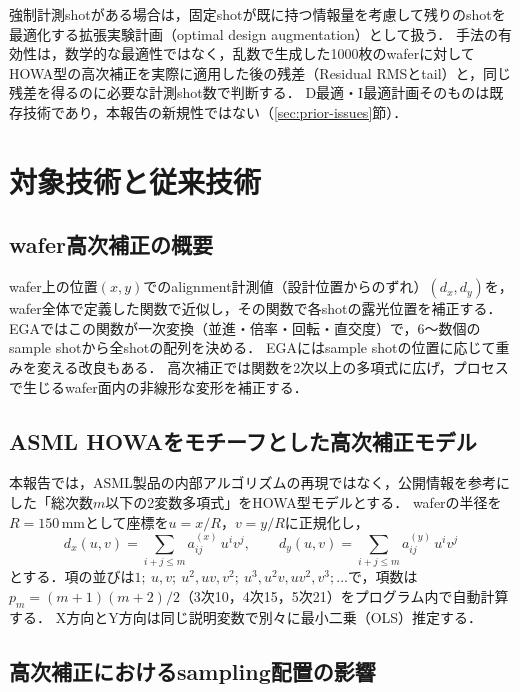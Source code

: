\documentclass[10.5pt,a4paper]{ltjsarticle}
\newcommand{\mm}{\,\mathrm{mm}}
\begin{document}
強制計測shotがある場合は，固定shotが既に持つ情報量を考慮して残りのshotを最適化する拡張実験計画（optimal design augmentation）として扱う．
手法の有効性は，数学的な最適性ではなく，乱数で生成した1000枚のwaferに対してHOWA型の高次補正を実際に適用した後の残差（Residual RMSとtail）と，同じ残差を得るのに必要な計測shot数で判断する．
D最適・I最適計画そのものは既存技術であり，本報告の新規性ではない（\ref{sec:prior-issues}節）．

\section{対象技術と従来技術}

\subsection{wafer高次補正の概要}

wafer上の位置$(x,y)$でのalignment計測値（設計位置からのずれ）$(d_x,d_y)$を，wafer全体で定義した関数で近似し，その関数で各shotの露光位置を補正する．
EGAではこの関数が一次変換（並進・倍率・回転・直交度）で，6〜数個のsample shotから全shotの配列を決める\cite{slonaker1988}．
EGAにはsample shotの位置に応じて重みを変える改良もある\cite{us5493402}．
高次補正では関数を2次以上の多項式に広げ，プロセスで生じるwafer面内の非線形な変形を補正する\cite{adel2007}．

\subsection{ASML HOWAをモチーフとした高次補正モデル}
\label{sec:howa}

本報告では，ASML製品の内部アルゴリズムの再現ではなく，公開情報\cite{us9291916,wang2009,pike2012}を参考にした「総次数$m$以下の2変数多項式」をHOWA型モデルとする．
waferの半径を$R=150\mm$として座標を$u=x/R$，$v=y/R$に正規化し，
\begin{equation}
  d_x(u,v) = \sum_{i+j\le m} a^{(x)}_{ij}\,u^i v^j,\qquad
  d_y(u,v) = \sum_{i+j\le m} a^{(y)}_{ij}\,u^i v^j
  \label{eq:howa}
\end{equation}
とする．項の並びは$1;\ u,v;\ u^2,uv,v^2;\ u^3,u^2v,uv^2,v^3;\dots$で，項数は$p_m=(m+1)(m+2)/2$（3次10，4次15，5次21）をプログラム内で自動計算する．
X方向とY方向は同じ説明変数で別々に最小二乗（OLS）推定する．

\subsection{高次補正におけるsampling配置の影響}
\end{document}
